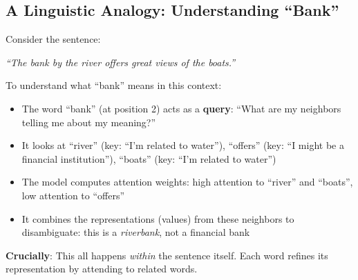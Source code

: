 \documentclass{article}
\begin{document}
\subsection{A Linguistic Analogy: Understanding ``Bank''}

Consider the sentence:
\begin{center}
\textit{``The bank by the river offers great views of the boats.''}
\end{center}

To understand what ``bank'' means in this context:
\begin{itemize}
\item The word ``bank'' (at position 2) acts as a \textbf{query}: ``What are my neighbors telling me about my meaning?''
\item It looks at ``river'' (key: ``I'm related to water''), ``offers'' (key: ``I might be a financial institution''), ``boats'' (key: ``I'm related to water'')
\item The model computes attention weights: high attention to ``river'' and ``boats'', low attention to ``offers''
\item It combines the representations (values) from these neighbors to disambiguate: this is a \textit{riverbank}, not a financial bank
\end{itemize}

\textbf{Crucially}: This all happens \textit{within} the sentence itself. Each word refines its representation by attending to related words.

\begin{center}
\end{center}
\end{document}
